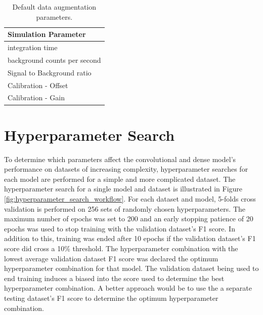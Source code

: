 \begin{table}[H]
\centering
\caption{Default data augmentation parameters.}
\begin{tabular}{l}
\hline
\textbf{Simulation Parameter} \\ \hline
integration time \\ 
background counts per second \\ 
Signal to Background ratio \\ 
Calibration - Offset \\ 
Calibration - Gain \\ \hline
\end{tabular}
\label{table:all_variable_simulation_parameters}
\end{table}


\section{Hyperparameter Search}

To determine which parameters affect the convolutional and dense model's performance on datasets of increasing complexity, hyperparameter searches for each model are performed for a simple and more complicated dataset. The hyperparameter search for a single model and dataset is illustrated in Figure \ref{fig:hyperparameter_search_workflow}. For each dataset and model, 5-folds cross validation is performed on 256 sets of randomly chosen hyperparameters. The maximum number of epochs was set to 200 and an early stopping patience of 20 epochs was used to stop training with the validation dataset's F1 score. In addition to this, training was ended after 10 epochs if the validation dataset's F1 score did cross a 10\% threshold. The hyperparameter combination with the lowest average validation dataset F1 score was declared the optimum hyperparameter combination for that model. The validation dataset being used to end training induces a biased into the score used to determine the best hyperparameter combination. A better approach would be to use the a separate testing dataset's F1 score to determine the optimum hyperparameter combination.

